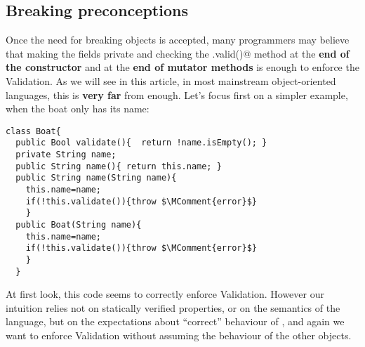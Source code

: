 \subsection{Breaking preconceptions}
Once the need for breaking objects is accepted, 
many programmers may believe that making the fields private and checking the \Q@.valid()@ method
at the \textbf{end of the constructor} and at the \textbf{end of mutator methods} is enough to enforce the 
Validation.
As we will see in this article, in most mainstream object-oriented languages, this is \textbf{very far} from enough.
Let's focus first on a simpler example, when the boat only has its name:
\begin{lstlisting}
class Boat{
  public Bool validate(){  return !name.isEmpty(); }
  private String name;
  public String name(){ return this.name; }
  public String name(String name){
    this.name=name;
    if(!this.validate()){throw $\MComment{error}$}
    }
  public Boat(String name){
    this.name=name;
    if(!this.validate()){throw $\MComment{error}$}
    }
  }
\end{lstlisting}
\noindent At first look, this code seems to correctly enforce Validation.
However our intuition relies not on statically verified properties, or on the semantics of the language,
but on the expectations about ``correct'' behaviour of \Q@String@, and again
we want to enforce Validation without assuming the behaviour of the other objects.
